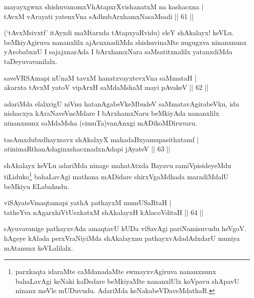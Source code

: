 \begin{shl}
mayayxgwnx shishuvanomxVhAtapxrXvishanatxM na kashacxna |\\
tAvxM vArayati yatenxVna sAdhubArxhamxNasaMsadi \hfill || 61 ||
\end{shl}

\begin{artha}
(`tAvxMsivxtf' itAyxdi maMtarxda tAtapxyaRvidu) eleY shAkalayx! keVLu. beMkiyAgiruva nananxlilx ajAcnxnadiMda shishuvinaMte nugugxva ninanxnunx yArobabxnU I sajajxnarAda I bArxhamxNara saMsatitxnalilx yatanxdiMda taDeyuvavanilalx.
\end{artha}

\begin{shl}
saveVRSAmapi nUnaM tavxM hanatxvayxtevxVna saMmataH |\\
akarxta tAvxM yatoV vipArxH saMdaMshaM mayi pAvakeV \hfill || 62 ||
\end{shl}

\begin{artha}
adariMda elalxrigU niVnu hatanAgabeVkeMbudeV saMmatavAgirabeVku, idu nishacxya kAraNaveVneMdare I bArxhamxNaru beMkiyAda nananxlilx ninanxnunx saMdaMsha (cimuTa)vanAnxgi mADikoMDiruvaru.
\end{artha}

\begin{shl}
tasAmxdubxdhayxsavx shAkalxyX mahadaBxyamupasithxtamf |\\
atinimaRthanAdaginxshacxnadxnAdapi jAyateV \hfill || 63 ||
\end{shl}

\begin{artha}
shAkalayx keVLu adariMda ninage mahatAtxda Bayavu samiVpisideyeMdu tiLiduko\footnote[1]{parxkaqta idaraMte caMdanadaMte swmayxvAgiruva nananxnunx bahaLavAgi keNaki kaDedare beMkiyaMte nananxlUlx koVpavu shApavU ninanx meVle mUDuvudu. AdariMda keNakabeVDaveMdathaR.} bahaLavAgi mathana mADidare shirxVgaMdhada maradiMdalU beMkiyu ELabahudu.
\end{artha}

\begin{shl}
viSAyateV\s maqtamapi yathA pathayxM mumUSaRtaH |\\
tatheYva nAgarxhiVtUsxkatxM shAkalayxH kAlacoVditaH \hfill || 64 ||
\end{shl}

\begin{artha}%
sAyuvavanige pathayxvAda amaqtavU kUDa viSavAgi pariNamisuvudu heVgoV. hAgeye kAlada perxVraNiyiMda shAkalayxnu pathayxvAdadAdxdarU muniya mAtanunx keVLalilalx.
\end{artha}

